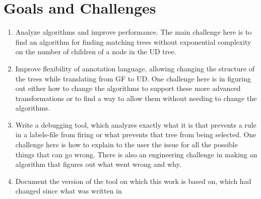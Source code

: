 

\section{Goals and Challenges}





\begin{enumerate}
    \item 
Analyze algorithms and improve performance. The main challenge here is to find an algorithm for finding matching trees without exponential complexity on the number of children of a node in the UD tree.

\item
Improve flexibility of annotation language, allowing changing the structure of the trees while translating from GF to UD. One challenge here is in figuring out either how to change the algorithms to support these more advanced transformations or to find a way to allow them without needing to change the algorithms.
\item
 Write a debugging tool, which analyzes exactly what it is that prevents a rule in a labels-file from firing or what prevents that tree from being selected.
One challenge here is how to explain to the user the issue for all the possible things that can go wrong.
There is also an engineering challenge in making an algorithm that figures out what went wrong and why.

\item
 Document the version of the tool on which this work is based on, which had changed since what was written in \cite{kolachina-ranta-2017}
\end{enumerate}

